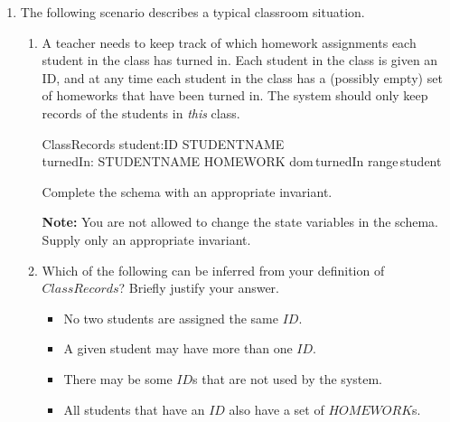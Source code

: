 \documentclass{article}
\begin{document}
\begin{enumerate}
\begin{enumerate}
\end{enumerate}

\item The following scenario describes a typical classroom
situation.

\begin{enumerate} \item A teacher needs to keep track of
which homework assignments each student in the class has turned
in. Each student in the class is given an ID, and at any time each
student in the class has a (possibly empty) set of homeworks that
have been turned in. The system should only keep records of the
students in {\em this\/} class.

\begin{zed}
\end{zed}
\begin{schema}{ClassRecords}
    student:ID \pfun STUDENTNAME \\
    turnedIn: STUDENTNAME \pfun \power HOMEWORK
\where
\color{blue}
dom\,turnedIn \subseteq range\,student 
\end{schema}

Complete the schema with an appropriate invariant.

\textbf{Note:} You are not allowed to change the state variables
in the schema. Supply only an appropriate invariant.


\item Which of the following can be inferred from your definition
of $ClassRecords$? Briefly justify your answer.

\begin{itemize}
\item No two students are assigned the same $ID$.

\item A given student may have more than one $ID$.

\item There may be some $ID$s that are not used by the system.

\item All students that have an $ID$ also have a set of
$HOMEWORK$s.


\end{itemize}
\end{enumerate}
\end{enumerate}
\end{document}
